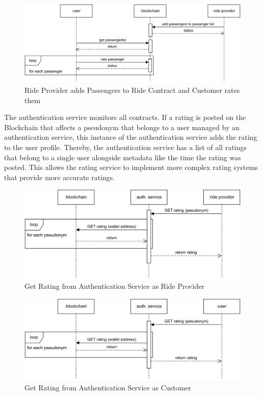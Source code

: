 \begin{figure}[h]
    \centering
    \includegraphics[width=\linewidth]{data/8.svg}
    \caption{Ride Provider adds Passengers to Ride Contract and Customer rates them}
    \label{fig:directSVG}
\end{figure}


The authentication service monitors all contracts. If a rating is posted on the Blockchain that affects a pseudonym that belongs to a user managed by an authentication service, this instance of the authentication service adds the rating to the user profile. Thereby, the authentication service has a list of all ratings that belong to a single user alongside metadata like the time the rating was posted. This allows the rating service to implement more complex rating systems that provide more accurate ratings.

\begin{figure}[h]
    \centering
    \includegraphics[width=\linewidth]{data/7.svg}
    \caption{Get Rating from Authentication Service as Ride Provider}
    \label{fig:directSVG}
\end{figure}

\begin{figure}[h]
    \centering
    \includegraphics[width=\linewidth]{data/9.svg}
    \caption{Get Rating from Authentication Service as Customer}
    \label{fig:directSVG}
\end{figure}


